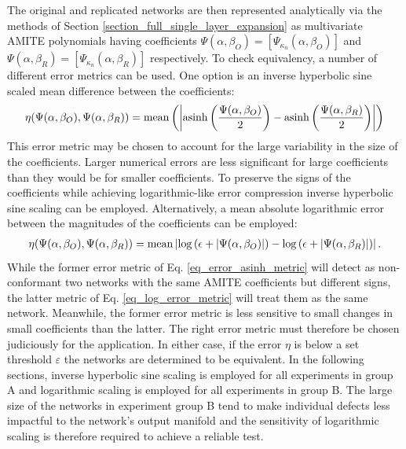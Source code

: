 The original and replicated networks are then represented analytically
via the methods of Section \ref{section_full_single_layer_expansion}
as multivariate AMITE polynomials having coefficients
$\Psi(\alpha, \beta_O) = \left[
\Psi_{\kappa_n}(\alpha, \beta_O)
\right]$ and
$\Psi(\alpha, \beta_R) = \left[
\Psi_{\kappa_n}(\alpha, \beta_R)
\right]$ respectively.  To check equivalency, a number of different
error metrics can be used.  One option is an inverse hyperbolic sine
scaled mean difference between the coefficients:
\begin{equation}
	\label{eq_error_asinh_metric}
	\eta(\Psi(\alpha, \beta_O), \Psi(\alpha, \beta_R)) =
	\operatorname{mean}\left(\left|\operatorname{asinh}\left(\frac{\Psi(\alpha, \beta_O)}{2}\right) - \operatorname{asinh}\left(\frac{\Psi(\alpha, \beta_R)}{2}\right)\right|\right)
\end{equation}
This error metric may be chosen to account for the large variability
in the size of the coefficients.  Larger numerical errors are less
significant for large coefficients than they would be for smaller
coefficients.  To preserve the signs of the coefficients while
achieving logarithmic-like error compression inverse hyperbolic sine scaling
can be employed. Alternatively, a mean absolute logarithmic error between the
magnitudes of the coefficients can be employed:
\begin{equation}
	\begin{split}
		\label{eq_log_error_metric}
		\eta(\Psi(\alpha, \beta_O), \Psi(\alpha, \beta_R)) =
		\operatorname{mean}\left|
		\log\left(\epsilon + |\Psi(\alpha, \beta_O)|\right) -
		\log\left(\epsilon + |\Psi(\alpha, \beta_R)|\right)
		\right|.
	\end{split}
\end{equation}
While the former error metric of Eq. \ref{eq_error_asinh_metric}
will detect as non-conformant  two networks with the same AMITE coefficients
but different signs, the latter metric of Eq. \ref{eq_log_error_metric} will
treat them as the same network.  Meanwhile,
the former error metric is less sensitive to small changes in small
coefficients than the latter.  The right error metric must therefore
be chosen judiciously for the application. In either case, if the
error $\eta$ is below a set threshold $\varepsilon$ the
networks are determined to be equivalent.
In the following sections, inverse hyperbolic sine scaling is employed
for all experiments in group A and logarithmic scaling is employed
for all experiments in group B.  The large size of the networks in
experiment group B tend to make individual defects less impactful to the
network's output manifold and the sensitivity of logarithmic
scaling is therefore required to achieve a reliable test.

